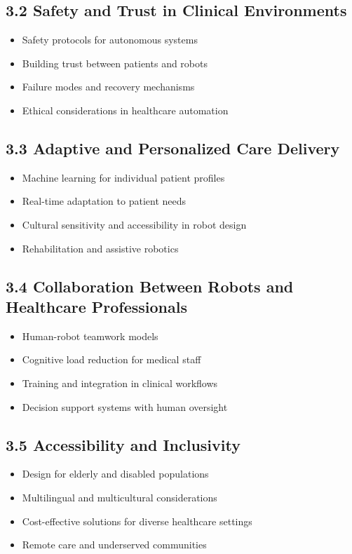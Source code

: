\documentclass[11pt, a4paper]{article}
\begin{document}
\subsection*{3.2 Safety and Trust in Clinical Environments}
\begin{itemize}
    \item Safety protocols for autonomous systems
    \item Building trust between patients and robots
    \item Failure modes and recovery mechanisms
    \item Ethical considerations in healthcare automation
\end{itemize}

\subsection*{3.3 Adaptive and Personalized Care Delivery}
\begin{itemize}
    \item Machine learning for individual patient profiles
    \item Real-time adaptation to patient needs
    \item Cultural sensitivity and accessibility in robot design
    \item Rehabilitation and assistive robotics
\end{itemize}

\subsection*{3.4 Collaboration Between Robots and Healthcare Professionals}
\begin{itemize}
    \item Human-robot teamwork models
    \item Cognitive load reduction for medical staff
    \item Training and integration in clinical workflows
    \item Decision support systems with human oversight
\end{itemize}

\subsection*{3.5 Accessibility and Inclusivity}
\begin{itemize}
    \item Design for elderly and disabled populations
    \item Multilingual and multicultural considerations
    \item Cost-effective solutions for diverse healthcare settings
    \item Remote care and underserved communities
\end{itemize}
\end{document}
